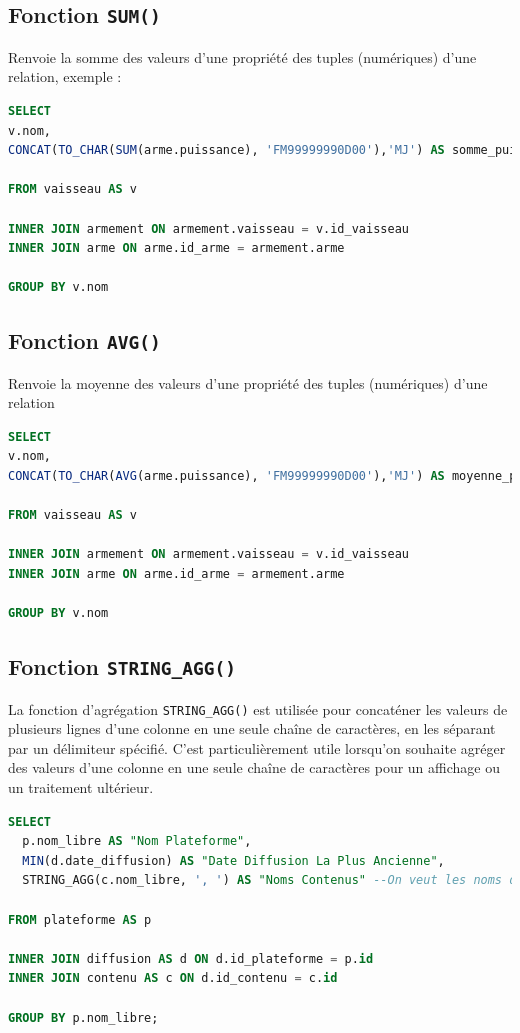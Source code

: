 \subsection{Fonction \texttt{SUM()}}
Renvoie la somme des valeurs d'une propriété des tuples (numériques) d'une relation, exemple :

\begin{lstlisting}[language=SQL]
SELECT
v.nom,
CONCAT(TO_CHAR(SUM(arme.puissance), 'FM99999990D00'),'MJ') AS somme_puissance

FROM vaisseau AS v

INNER JOIN armement ON armement.vaisseau = v.id_vaisseau
INNER JOIN arme ON arme.id_arme = armement.arme

GROUP BY v.nom
\end{lstlisting}

\subsection{Fonction \texttt{AVG()}}
Renvoie la moyenne des valeurs d'une propriété des tuples (numériques) d'une relation

\begin{lstlisting}[language=SQL]
SELECT
v.nom,
CONCAT(TO_CHAR(AVG(arme.puissance), 'FM99999990D00'),'MJ') AS moyenne_puissance

FROM vaisseau AS v

INNER JOIN armement ON armement.vaisseau = v.id_vaisseau
INNER JOIN arme ON arme.id_arme = armement.arme

GROUP BY v.nom
\end{lstlisting}

\subsection{Fonction \texttt{STRING\_AGG()}}
La fonction d'agrégation \texttt{STRING\_AGG()} est utilisée pour concaténer les valeurs de plusieurs lignes d'une colonne en une seule chaîne de caractères, en les séparant par un délimiteur spécifié. C'est particulièrement utile lorsqu'on souhaite agréger des valeurs d'une colonne en une seule chaîne de caractères pour un affichage ou un traitement ultérieur.

\begin{lstlisting}[language=SQL]
SELECT
  p.nom_libre AS "Nom Plateforme",
  MIN(d.date_diffusion) AS "Date Diffusion La Plus Ancienne",
  STRING_AGG(c.nom_libre, ', ') AS "Noms Contenus" --On veut les noms des éléments diffusés MIN
  
FROM plateforme AS p

INNER JOIN diffusion AS d ON d.id_plateforme = p.id
INNER JOIN contenu AS c ON d.id_contenu = c.id

GROUP BY p.nom_libre;   
\end{lstlisting}

